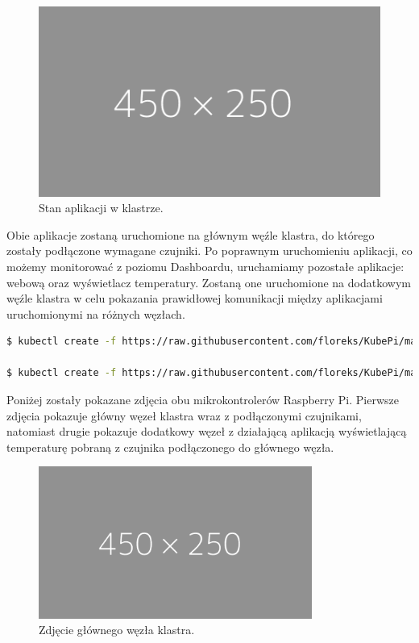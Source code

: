 \documentclass[12pt]{report}
\begin{document}
{\begin{figure}[h]
	\centering
	\includegraphics[width=1\textwidth]{images/placeholder-wide.png}
	\caption{Stan aplikacji w klastrze.}
\end{figure}
\FloatBarrier

\noindent Obie aplikacje zostaną uruchomione na głównym węźle klastra, do którego zostały podłączone wymagane czujniki. Po poprawnym uruchomieniu aplikacji, co możemy monitorować z poziomu Dashboardu, uruchamiamy pozostałe aplikacje: webową oraz wyświetlacz temperatury. Zostaną one uruchomione na dodatkowym węźle klastra w celu pokazania prawidłowej komunikacji między aplikacjami uruchomionymi na różnych węzłach.
\begin{lstlisting}[language=bash]
$ kubectl create -f https://raw.githubusercontent.com/floreks/KubePi/master/config/kubepi-monitor-arm.yaml

$ kubectl create -f https://raw.githubusercontent.com/floreks/KubePi/master/config/led-max7219-client-arm.yaml
\end{lstlisting}

\noindent Poniżej zostały pokazane zdjęcia obu mikrokontrolerów Raspberry Pi. Pierwsze zdjęcia pokazuje główny węzeł klastra wraz z podłączonymi czujnikami, natomiast drugie pokazuje dodatkowy węzeł z działającą aplikacją wyświetlającą temperaturę pobraną z czujnika podłączonego do głównego węzła.
\begin{figure}[h]
	\centering
	\includegraphics[width=0.8\textwidth]{images/placeholder-wide.png}
	\caption{Zdjęcie głównego węzła klastra.}
\end{figure}
\FloatBarrier

}
\end{document}
